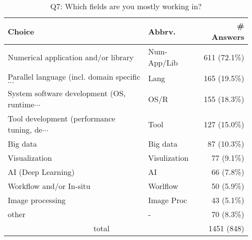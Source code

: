 \begin{table}[htb]%
\begin{center}%
\caption{Q7: Which fields are you mostly working in?}%
\label{tab:Q7-ans}%
\begin{tabular}{l|l|r}%
\hline%
Choice & Abbrv. & \# Answers \\%
\hline%
Numerical application and/or library & Num-App/Lib & 611 (72.1\%) \\%
{\small Parallel language (incl. domain specific$\cdots$} & Lang & 165 (19.5\%) \\%
{\small System software development (OS, runtime$\cdots$} & OS/R & 155 (18.3\%) \\%
{\small Tool development (performance tuning, de$\cdots$} & Tool & 127 (15.0\%) \\%
Big data & Big data & 87 (10.3\%) \\%
Visualization & Visulization & 77 (9.1\%) \\%
AI (Deep Learning) & AI & 66 (7.8\%) \\%
Workflow and/or In-situ & Worlflow & 50 (5.9\%) \\%
Image processing & Image Proc & 43 (5.1\%) \\%
other & - & 70 (8.3\%) \\%
\hline%
\multicolumn{2}{c}{total} & 1451 (848)\\%
\hline%
\end{tabular}%
\end{center}%
\end{table}%
